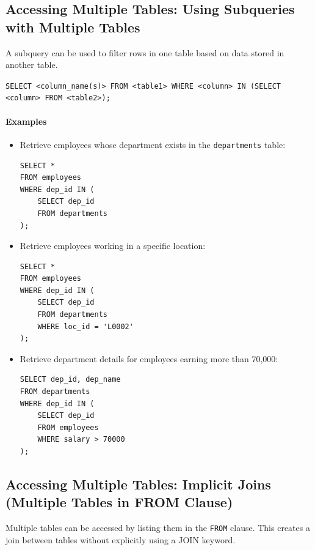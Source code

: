 \documentclass{article}
\begin{document}
\subsection{Accessing Multiple Tables: Using Subqueries with Multiple Tables}

A subquery can be used to filter rows in one table based on data stored in another table.

\begin{FormulaBox}
\texttt{SELECT <column\_name(s)> FROM <table1>
WHERE <column> IN (SELECT <column> FROM <table2>);}
\end{FormulaBox}

\paragraph{Examples}

\begin{itemize}
    \item Retrieve employees whose department exists in the \texttt{departments} table:
\begin{verbatim}
SELECT *
FROM employees
WHERE dep_id IN (
    SELECT dep_id
    FROM departments
);
\end{verbatim}

    \item Retrieve employees working in a specific location:
\begin{verbatim}
SELECT *
FROM employees
WHERE dep_id IN (
    SELECT dep_id
    FROM departments
    WHERE loc_id = 'L0002'
);
\end{verbatim}

    \item Retrieve department details for employees earning more than 70,000:
\begin{verbatim}
SELECT dep_id, dep_name
FROM departments
WHERE dep_id IN (
    SELECT dep_id
    FROM employees
    WHERE salary > 70000
);
\end{verbatim}
\end{itemize}

\subsection{Accessing Multiple Tables: Implicit Joins (Multiple Tables in FROM Clause)}

Multiple tables can be accessed by listing them in the \texttt{FROM} clause.  
This creates a join between tables without explicitly using a JOIN keyword.
\end{document}
